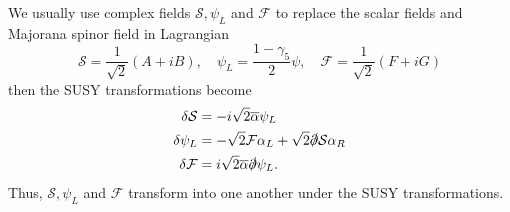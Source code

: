 \documentclass[12pt]{report}
\begin{document}
We usually use complex fields $\mathcal{S}, \psi_{L}$ and $\mathcal{F}$ to replace the scalar fields and Majorana spinor field in Lagrangian
\begin{equation}
\mathcal{S} = \frac{1}{\sqrt{2}} (A + i B), \quad \psi_{L} = \frac{1 - \gamma_{5}}{2} \psi, \quad \mathcal{F} = \frac{1}{\sqrt{2}} (F + i G)
\end{equation}
then the SUSY transformations become
\begin{align}
\delta \mathcal{S} &= -i \sqrt{2} \overline{\alpha} \psi_{L} \label{eq: SUSY transformation 1}\\
\delta \psi_{L} &= - \sqrt{2} \mathcal{F} \alpha_{L} + \sqrt{2} \slashed{\partial} \mathcal{S} \alpha_{R} \label{eq: SUSY transformation 2}\\
\delta \mathcal{F} &= i \sqrt{2} \overline{\alpha} \slashed{\partial} \psi_{L} \label{eq: SUSY transformation 3} .
\end{align}
Thus, $\mathcal{S}, \psi_{L}$ and $\mathcal{F}$ transform into one another under the SUSY transformations.
\end{document}
